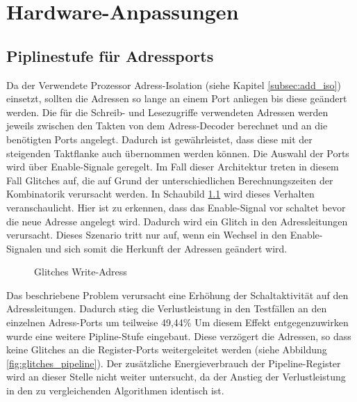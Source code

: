 \chapter{Hardware-Anpassungen}

\section{Piplinestufe für Adressports}
Da der Verwendete Prozessor Adress-Isolation (siehe Kapitel \ref{subsec:add_iso}) einsetzt, sollten die Adressen so lange an einem Port anliegen bis diese geändert werden.
Die für die Schreib- und Lesezugriffe verwendeten Adressen werden jeweils zwischen den Takten von dem Adress-Decoder berechnet und an die benötigten Ports angelegt. Dadurch ist gewährleistet, dass diese mit der steigenden Taktflanke auch übernommen werden können. Die Auswahl der Ports wird über Enable-Signale geregelt. Im Fall dieser Architektur treten in diesem Fall Glitches auf, die auf Grund der unterschiedlichen Berechnungszeiten der Kombinatorik verursacht werden. In Schaubild \ref{fig:glitches} wird dieses Verhalten veranschaulicht. Hier ist zu erkennen, dass das Enable-Signal vor schaltet bevor die neue Adresse angelegt wird. Dadurch wird ein Glitch in den Adressleitungen verursacht. Dieses Szenario tritt nur auf, wenn ein Wechsel in den Enable-Signalen und sich somit die Herkunft der Adressen geändert wird.

\begin{figure}[H] 
	\centering
	
	\caption{Glitches Write-Adress}
	\label{fig:glitches}
\end{figure}


Das beschriebene Problem verursacht eine Erhöhung der Schaltaktivität auf den Adressleitungen. Dadurch stieg die Verlustleistung in den Testfällen an den einzelnen Adress-Ports um teilweise 49,44\%
Um diesem Effekt entgegenzuwirken wurde eine weitere Pipline-Stufe eingebaut. Diese verzögert die Adressen, so dass keine Glitches an die Register-Ports weitergeleitet werden (siehe Abbildung \ref{fig:glitches_pipeline}). Der zusätzliche Energieverbrauch der Pipeline-Register wird an dieser Stelle nicht weiter untersucht, da der Anstieg der Verlustleistung in den zu vergleichenden Algorithmen identisch ist.

